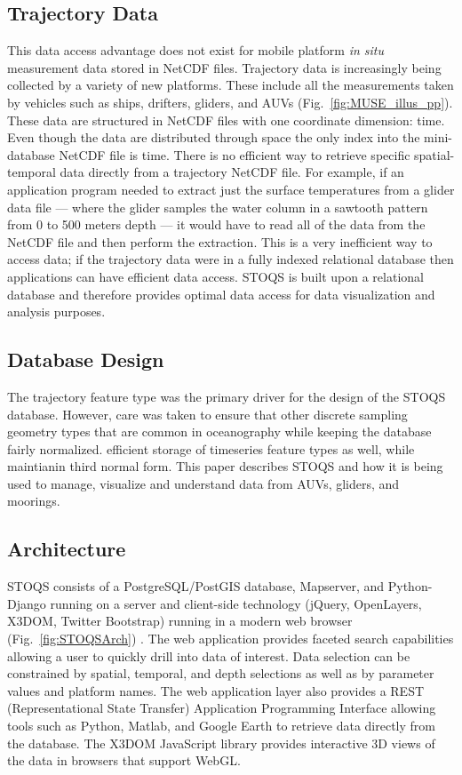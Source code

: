 \documentclass[conference]{IEEEtran}
\begin{document}
\subsection{Trajectory Data}

This data access advantage does not exist for mobile platform \textit{in situ} measurement data stored in NetCDF files. Trajectory data is increasingly being collected by a variety of new platforms. These include all the measurements taken by vehicles such as ships, drifters, gliders, and AUVs (Fig.~\ref{fig:MUSE_illus_pp}). These data are structured in NetCDF files with one coordinate dimension: time. Even though the data are distributed through space the only index into the mini-database NetCDF file is time. There is no efficient way to retrieve specific spatial-temporal data directly from a trajectory NetCDF file. For example, if an application program needed to extract just the surface temperatures from a glider data file --- where the glider samples the water column in a sawtooth pattern from 0 to 500 meters depth --- it would have to read all of the data from the NetCDF file and then perform the extraction. This is a very inefficient way to access data; if the trajectory data were in a fully indexed relational database then applications can have efficient data access. STOQS is built upon a relational database and therefore provides optimal data access for data visualization and analysis purposes.


\subsection{Database Design}
The trajectory feature type was the primary driver for the design of the STOQS database. However, care was taken to ensure that other discrete sampling geometry types \cite{DSG} that are common in oceanography while keeping the database fairly normalized. efficient storage of timeseries feature types as well, while maintianin third normal form.
This paper describes STOQS and how it is being used to manage, visualize and understand data from AUVs, gliders, and moorings.



\subsection{Architecture}

STOQS consists of a PostgreSQL/PostGIS database, Mapserver, and Python-Django running on a server and client-side technology (jQuery, OpenLayers, X3DOM, Twitter Bootstrap) running in a modern web browser (Fig.~\ref{fig:STOQSArch}) . The web application provides faceted search capabilities allowing a user to quickly drill into data of interest. Data selection can be constrained by spatial, temporal, and depth selections as well as by parameter values and platform names. The web application layer also provides a REST (Representational State Transfer) Application Programming Interface allowing tools such as Python, Matlab, and Google Earth to retrieve data directly from the database. The X3DOM JavaScript library provides interactive 3D views of the data in browsers that support WebGL.
\end{document}
